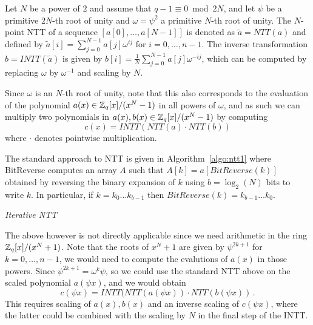 Let $N$ be a power of $2$ and assume that $q-1 \equiv 0 \bmod 2N$, and let $\psi$ be a primitive $2N$-th root 
of unity and $\omega = \psi^2$ a primitive $N$-th root of unity.  The $N$-point NTT of a sequence 
$[a[0], \ldots, a[N-1]]$ is denoted as $\tilde{a} = NTT(a)$ and defined by $\tilde{a}[i] = \sum_{j = 0}^{N-1} a[j] \omega^{i j}$
for $i = 0, \ldots, n-1$.  The inverse transformation $b = INTT(\tilde{a})$ is given by 
$b[i] = \frac{1}{N} \sum_{j = 0}^{N-1} a[j] \omega^{-i j}$, which can be computed by replacing $\omega$ 
by $\omega^{-1}$ and scaling by $N$.

Since $\omega$ is an $N$-th root of unity, note that this also corresponds to the evaluation 
of the polynomial $a(x) \in \mathbb{Z}_q[x]/(x^N - 1)$ in all powers of $\omega$, and as such we can multiply two 
polynomials in $a(x), b(x) \in \mathbb{Z}_q[x]/(x^N - 1)$ by computing
\[  c(x) = INTT(NTT(a) \cdot NTT(b))  \]
where $\cdot$ denotes pointwise multiplication.

The standard approach to NTT is given in Algorithm~\ref{algo:ntt1} where BitReverse
computes an array $A$ such that $A[k] = a[BitReverse(k)]$ obtained by reversing
the binary expansion of $k$ using $b = \log_2(N)$ bits to write $k$.
In particular, if $k = k_0 \ldots k_{b-1}$ then $BitReverse(k) = k_{b-1} \ldots k_0$. 
\begin{algorithm}[!t] \label{algo:ntt1}
\begin{scriptsize}
\caption{\emph{Iterative NTT}}
\end{scriptsize}
\end{algorithm} 


The above however is not directly applicable since we need arithmetic in the ring $\mathbb{Z}_q[x]/(x^N+1)$.
Note that the roots of $x^N+1$ are given by $\psi^{2k + 1}$ for $k = 0, \ldots, n-1$,  we would 
need to compute the evalutions of $a(x)$ in those powers.  Since $\psi^{2k + 1} = \omega^k \psi$, 
so we could use the standard NTT above on the scaled polynomial $a(\psi x)$, and we would obtain
\[  c(\psi x) =    INTT(NTT(a(\psi x)) \cdot NTT(b(\psi x))   \, . \]
This requires scaling of $a(x), b(x)$ and an inverse scaling of $c(\psi x)$, where the latter could be 
combined with the scaling by $N$ in the final step of the INTT.


